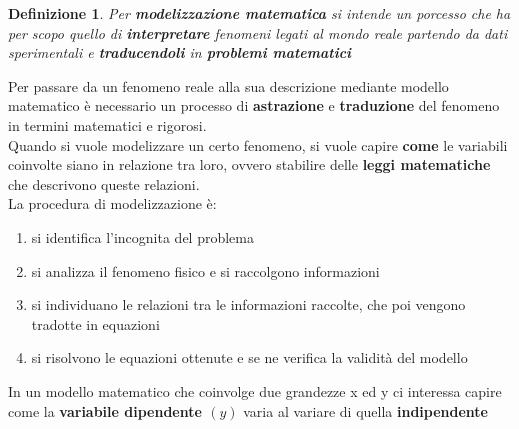 \documentclass[12pt, a4paper]{article}
\theoremstyle{break}
\newtheorem{defn}{Definizione}
\theoremstyle{lemma}
\theoremstyle{lemma}
\theoremstyle{lemma}
\begin{document}
\begin{defn}
  Per \textbf{modelizzazione matematica} si intende un porcesso che ha per scopo quello di \textbf{interpretare} fenomeni legati al mondo reale partendo da dati sperimentali e \textbf{traducendoli} in \textbf{problemi matematici}\\
\end{defn}

Per passare da un fenomeno reale alla sua descrizione mediante modello matematico è necessario un processo di \textbf{astrazione} e \textbf{traduzione} del fenomeno in termini matematici e rigorosi. \\

\vspace{1mm}
Quando si vuole modelizzare un certo fenomeno, si vuole capire \textbf{come} le variabili coinvolte siano in relazione tra loro, ovvero stabilire delle \textbf{leggi matematiche} che descrivono queste relazioni. \\

\vspace{1mm}
La procedura di modelizzazione è:
\begin{enumerate}
  \item si identifica l'incognita del problema
  \item si analizza il fenomeno fisico e si raccolgono informazioni
  \item si individuano le relazioni tra le informazioni raccolte, che poi vengono tradotte in equazioni
  \item si risolvono le equazioni ottenute e se ne verifica la validità del modello
\end{enumerate}


In un modello matematico che coinvolge due grandezze x ed y ci interessa capire come la \textbf{variabile dipendente $(y)$} varia al variare di quella \textbf{indipendente}\\
\end{document}
